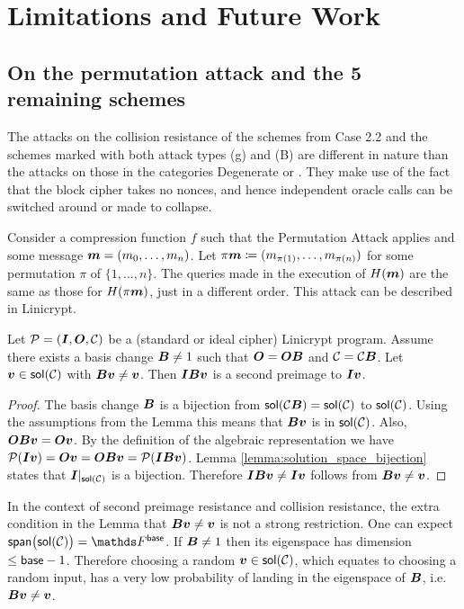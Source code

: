 \section{Limitations and Future Work}

\subsection{On the permutation attack and the 5 remaining schemes}
The attacks on the collision resistance of the schemes from Case 2.2 and the schemes marked with both attack types (g) and (B)
are different in nature than the attacks on those in the categories Degenerate or \OHCS.
They make use of the fact that the block cipher takes no nonces,
and hence independent oracle calls can be switched around or made to collapse.

Consider a compression function $f$ such that the Permutation Attack applies and some message $\boldsymbol m = (m_0, \dots, m_n)$.
Let $\pi \boldsymbol m \coloneqq (m_{\pi(1)}, \dots, m_{\pi(n)})$ for some permutation $\pi$ of $\{1,\dots,n\}$.
The queries made in the execution of $H(\boldsymbol m)$ are the same as those for $H(\pi\boldsymbol m)$,
just in a different order.
This attack can be described in Linicrypt.

\begin{lemma}
    Let $\mathcal{P} = (\boldsymbol{I}, \boldsymbol{O}, \mathcal{C})$ be a (standard or ideal cipher) Linicrypt program.
    Assume there exists a basis change $\boldsymbol{B} \neq 1$ such that $\boldsymbol{O} = \boldsymbol{O}\boldsymbol{B}$ and $\mathcal{C} = \mathcal{C}\boldsymbol{B}$.
    Let $\boldsymbol v \in \mathsf{sol}(\mathcal{C})$ with $\boldsymbol{B}\boldsymbol v \neq \boldsymbol v$.
    Then $\boldsymbol{I}\boldsymbol{B}\boldsymbol v$ is a second preimage to $\boldsymbol{I}\boldsymbol v$.
\end{lemma}
\begin{proof}
    The basis change $\boldsymbol{B}$ is a bijection from $\mathsf{sol}(\mathcal{C}\boldsymbol{B}) = \mathsf{sol}(\mathcal{C})$ to $\mathsf{sol}(\mathcal{C})$.
    Using the assumptions from the Lemma this means that $\boldsymbol{B}\boldsymbol v$ is in $\mathsf{sol}(\mathcal{C})$.
    Also, $\boldsymbol{O}\boldsymbol{B}\boldsymbol v = \boldsymbol{O}\boldsymbol v$.
    By the definition of the algebraic representation we have
    $\mathcal{P}(\boldsymbol{I}\boldsymbol v) = \boldsymbol{O}\boldsymbol v = \boldsymbol{O}\boldsymbol{B}\boldsymbol v = \mathcal{P}(\boldsymbol{I}\boldsymbol{B}\boldsymbol v)$.
    Lemma \ref{lemma:solution_space_bijection} states that $\boldsymbol{I}|_{\mathsf{sol}(\mathcal{C})}$ is a bijection.
    Therefore $\boldsymbol{I}\boldsymbol{B}\boldsymbol v \neq \boldsymbol{I}\boldsymbol v$ follows from $\boldsymbol{B}\boldsymbol v \neq \boldsymbol v$.
\end{proof}
In the context of second preimage resistance and collision resistance,
the extra condition in the Lemma that $\boldsymbol{B}\boldsymbol v \neq \boldsymbol v$ is not a strong restriction.
One can expect $\spn\big(\sol(\C)\big) = \Fsp$.
If $\boldsymbol{B} \neq 1$ then its eigenspace has dimension $\leq \mathsf{base} - 1$.
Therefore choosing a random $\boldsymbol v \in \mathsf{sol}(\mathcal{C})$, which equates to choosing a random input,
has a very low probability of landing in the eigenspace of $\boldsymbol{B}$, i.e. $\boldsymbol{B}\boldsymbol v \neq \boldsymbol v$.

